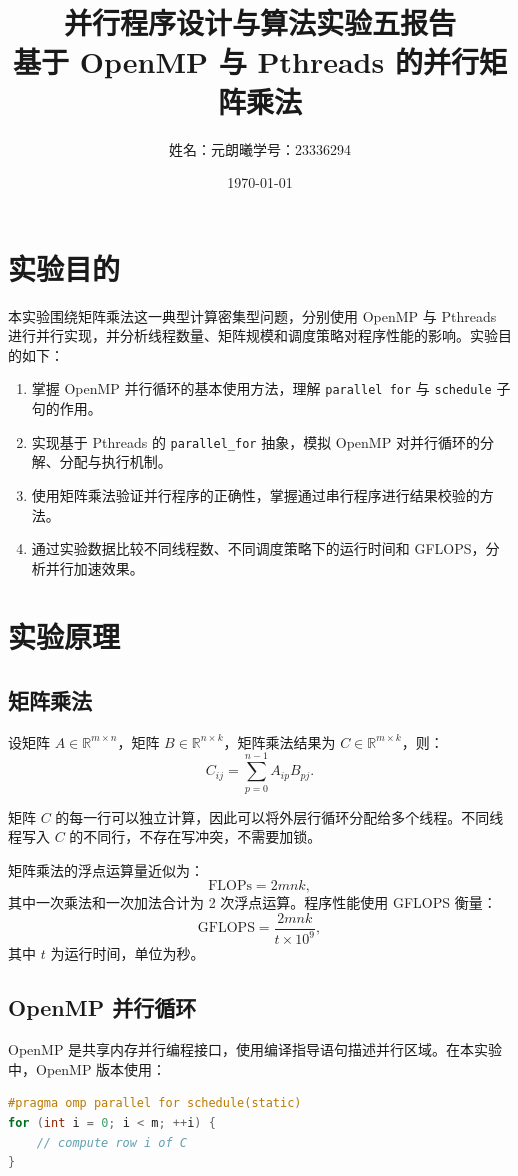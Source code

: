 \documentclass[12pt,a4paper]{ctexart}
\title{并行程序设计与算法实验五报告\\基于 OpenMP 与 Pthreads 的并行矩阵乘法}
\author{姓名：元朗曦\quad 学号：23336294}
\date{\today}
\begin{document}
\maketitle

\section{实验目的}
本实验围绕矩阵乘法这一典型计算密集型问题，分别使用 OpenMP 与 Pthreads 进行并行实现，并分析线程数量、矩阵规模和调度策略对程序性能的影响。实验目的如下：
\begin{enumerate}[itemsep=0.3em]
  \item 掌握 OpenMP 并行循环的基本使用方法，理解 \texttt{parallel for} 与 \texttt{schedule} 子句的作用。
  \item 实现基于 Pthreads 的 \texttt{parallel\_for} 抽象，模拟 OpenMP 对并行循环的分解、分配与执行机制。
  \item 使用矩阵乘法验证并行程序的正确性，掌握通过串行程序进行结果校验的方法。
  \item 通过实验数据比较不同线程数、不同调度策略下的运行时间和 GFLOPS，分析并行加速效果。
\end{enumerate}

\section{实验原理}

\subsection*{矩阵乘法}
设矩阵 $A\in\mathbb{R}^{m\times n}$，矩阵 $B\in\mathbb{R}^{n\times k}$，矩阵乘法结果为 $C\in\mathbb{R}^{m\times k}$，则：
\[
C_{ij}=\sum_{p=0}^{n-1}A_{ip}B_{pj}.
\]

矩阵 $C$ 的每一行可以独立计算，因此可以将外层行循环分配给多个线程。不同线程写入 $C$ 的不同行，不存在写冲突，不需要加锁。

矩阵乘法的浮点运算量近似为：
\[
\text{FLOPs}=2mnk,
\]
其中一次乘法和一次加法合计为 2 次浮点运算。程序性能使用 GFLOPS 衡量：
\[
\text{GFLOPS}=\frac{2mnk}{t\times 10^9},
\]
其中 $t$ 为运行时间，单位为秒。

\subsection*{OpenMP 并行循环}
OpenMP 是共享内存并行编程接口，使用编译指导语句描述并行区域。在本实验中，OpenMP 版本使用：
\begin{lstlisting}[language=C++]
#pragma omp parallel for schedule(static)
for (int i = 0; i < m; ++i) {
    // compute row i of C
}
\end{lstlisting}
\end{document}
